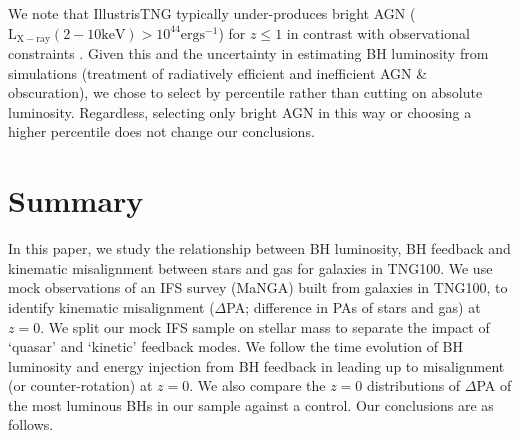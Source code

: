 \documentclass[fleqn,usenatbib]{mnras}
\begin{document}
We note that IllustrisTNG typically under-produces bright AGN ($\mathrm{L_{X-ray}(2-10 keV) > 10^{44}ergs^{-1}}$) for $z \leq 1$ in contrast with observational constraints \citep[see][]{habouzit2019}. Given this and the uncertainty in estimating BH luminosity from simulations (treatment of radiatively efficient and inefficient AGN \& obscuration), we chose to select by percentile rather than cutting on absolute luminosity. Regardless, selecting only bright AGN in this way or choosing a higher percentile does not change our conclusions.

\section{Summary} \label{sec:conclusion}

In this paper, we study the relationship between BH luminosity, BH feedback and kinematic misalignment between stars and gas for galaxies in TNG100. We use mock observations of an IFS survey (MaNGA) built from galaxies in TNG100, to identify kinematic misalignment ($\Delta$PA; difference in PAs of stars and gas) at $z=0$. We split our mock IFS sample on stellar mass to separate the impact of `quasar' and `kinetic' feedback modes. We follow the time evolution of BH luminosity and energy injection from BH feedback in leading up to misalignment (or counter-rotation) at $z=0$. We also compare the $z=0$ distributions of $\Delta$PA of the most luminous BHs in our sample against a control. Our conclusions are as follows.
\end{document}
